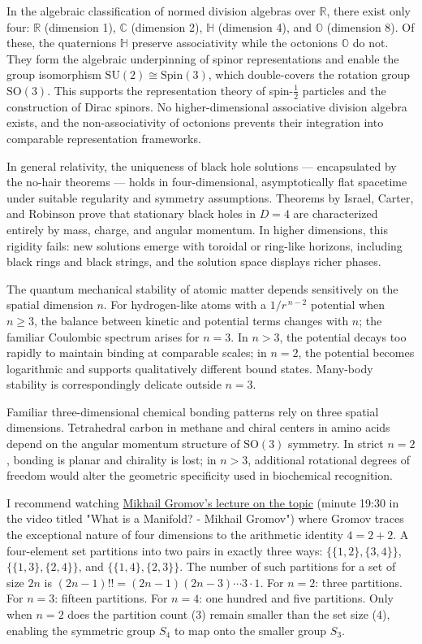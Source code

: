 In the algebraic classification of normed division algebras over $\mathbb{R}$, there exist only four: $\mathbb{R}$ (dimension 1), $\mathbb{C}$ (dimension 2), $\mathbb{H}$ (dimension 4), and $\mathbb{O}$ (dimension 8). Of these, the quaternions $\mathbb{H}$ preserve associativity while the octonions $\mathbb{O}$ do not. They form the algebraic underpinning of spinor representations and enable the group isomorphism $\mathrm{SU}(2) \cong \mathrm{Spin}(3)$, which double-covers the rotation group $\mathrm{SO}(3)$. This supports the representation theory of spin-$\tfrac{1}{2}$ particles and the construction of Dirac spinors. No higher-dimensional associative division algebra exists, and the non-associativity of octonions prevents their integration into comparable representation frameworks.

In general relativity, the uniqueness of black hole solutions — encapsulated by the no-hair theorems — holds in four-dimensional, asymptotically flat spacetime under suitable regularity and symmetry assumptions. Theorems by Israel, Carter, and Robinson prove that stationary black holes in $D=4$ are characterized entirely by mass, charge, and angular momentum. In higher dimensions, this rigidity fails: new solutions emerge with toroidal or ring-like horizons, including black rings and black strings, and the solution space displays richer phases.

The quantum mechanical stability of atomic matter depends sensitively on the spatial dimension $n$. For hydrogen-like atoms with a $1/r^{\,n-2}$ potential when $n\ge 3$, the balance between kinetic and potential terms changes with $n$; the familiar Coulombic spectrum arises for $n=3$. In $n>3$, the potential decays too rapidly to maintain binding at comparable scales; in $n=2$, the potential becomes logarithmic and supports qualitatively different bound states. Many-body stability is correspondingly delicate outside $n=3$.

Familiar three-dimensional chemical bonding patterns rely on three spatial dimensions. Tetrahedral carbon in methane and chiral centers in amino acids depend on the angular momentum structure of $\mathrm{SO}(3)$ symmetry. In strict $n=2$, bonding is planar and chirality is lost; in $n>3$, additional rotational degrees of freedom would alter the geometric specificity used in biochemical recognition.

I recommend watching \href{http://youtu.be/u5DLpAqX4YA&t=1170s}{Mikhail Gromov's lecture on the topic} (minute 19:30 in the video titled "What is a Manifold? - Mikhail Gromov") where Gromov traces the exceptional nature of four dimensions to the arithmetic identity $4 = 2 + 2$. A four-element set partitions into two pairs in exactly three ways: $\{\{1,2\}, \{3,4\}\}$, $\{\{1,3\}, \{2,4\}\}$, and $\{\{1,4\}, \{2,3\}\}$. The number of such partitions for a set of size $2n$ is $(2n-1)!! = (2n-1)(2n-3)\cdots 3 \cdot 1$. For $n=2$: three partitions. For $n=3$: fifteen partitions. For $n=4$: one hundred and five partitions. Only when $n=2$ does the partition count (3) remain smaller than the set size (4), enabling the symmetric group $S_4$ to map onto the smaller group $S_3$.

